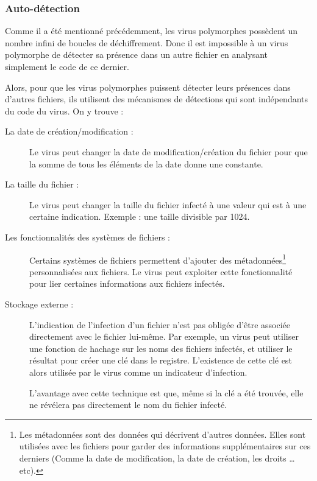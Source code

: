         \subsubsection{Auto-détection}
        Comme il a été mentionné précédemment, les virus polymorphes possèdent un nombre infini de boucles de 
        déchiffrement. Donc il est impossible à un virus polymorphe de détecter sa présence dans un autre fichier en 
        analysant simplement le code de ce dernier. %

        Alors, pour que les virus polymorphes puissent détecter leurs présences dans d'autres fichiers, ils utilisent
        des mécanismes de détections qui sont indépendants du code du virus. On y trouve : \cite{virus} %
        \begin{description}
            \item[La date de création/modification :] Le virus peut changer la date de modification/création
                du fichier pour que la somme de tous les éléments de la date donne une constante. %

            \item[La taille du fichier :] Le virus peut changer la taille du fichier infecté à une valeur qui est 
                à une certaine indication. Exemple : une taille divisible par 1024. %

            \item[Les fonctionnalités des systèmes de fichiers :] Certains systèmes de fichiers permettent
                d'ajouter des métadonnées\footnote{
                Les métadonnées sont des données qui décrivent d'autres données. 
                Elles sont utilisées avec les fichiers pour garder des informations supplémentaires sur ces derniers 
                (Comme la date de modification, la date de création, les droits \ldots{} etc).} 
                personnalisées aux fichiers. Le virus peut exploiter cette fonctionnalité pour lier 
                certaines informations aux fichiers infectés. %

            \item[Stockage externe :] L'indication de l'infection d'un fichier n'est pas obligée d'être associée
                directement avec le fichier lui-même. Par exemple, un virus peut utiliser une fonction de hachage 
                sur les noms des fichiers infectés, et utiliser le résultat pour créer une clé dans le registre.
                L'existence de cette clé est alors utilisée par le virus comme un indicateur d'infection. %

                L'avantage avec cette technique est que, même si la clé a été trouvée, elle ne révélera pas directement 
                le nom du fichier infecté. %

            \end{description}


